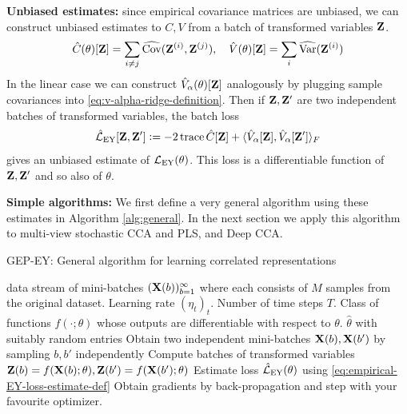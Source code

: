 \textbf{Unbiased estimates:}
since empirical covariance matrices are unbiased, we can construct unbiased estimates to $C, V$ from a batch of transformed variables $\mathbf{Z}$.
\begin{align}\label{eq:def-C-V-matrices-empirical}
    \hat{C}(\theta)[\mathbf{Z}] = \sum_{i \neq j} \widehat{\mathrm{Cov}}(\mathbf{Z}^{(i)}, \mathbf{Z}^{(j)}), \quad
    \hat{V}(\theta)[\mathbf{Z}] = \sum_{i} \widehat{\mathrm{Var}}(\mathbf{Z}^{(i)})
\end{align}
In the linear case we can construct $\hat{V}_\alpha(\theta)[\mathbf{Z}]$ analogously by plugging sample covariances into \cref{eq:v-alpha-ridge-definition}.
Then if $\mathbf{Z}, \mathbf{Z}'$ are two independent batches of transformed variables, the batch loss
\begin{align}\label{eq:empirical-EY-loss-estimate-def}
    \hat{\mathcal{L}}_\text{EY}[\mathbf{Z}, \mathbf{Z}'] \vcentcolon= - 2 \operatorname{trace} \hat{C}[\mathbf{Z}] + \langle \hat{V}_\alpha[\mathbf{Z}], \hat{V}_\alpha[\mathbf{Z}'] \rangle_F
\end{align}
gives an unbiased estimate of $\mathcal{L}_\text{EY}(\theta)$.%
This loss is a differentiable function of $\mathbf{Z}, \mathbf{Z}'$ and so also of $\theta$.

\textbf{Simple algorithms:}
We first define a very general algorithm using these estimates in Algorithm \ref{alg:general}.
In the next section we apply this algorithm to multi-view stochastic CCA and PLS, and Deep CCA.

\begin{algorithm}
   \caption{GEP-EY: General algorithm for learning correlated representations}
   \label{alg:general}
\begin{algorithmic}
    data stream of mini-batches $(\mathbf{X}(b))_{b=1}^\infty$ where each consists of $M$ samples from the original dataset. Learning rate $(\eta_t)_t$. Number of time steps $T$. Class of functions $f(\cdot; \theta)$ whose outputs are differentiable with respect to $\theta$.
    $\hat{\theta}$ with suitably random entries
       \STATE Obtain two independent mini-batches \( \mathbf{X}(b), \mathbf{X}(b') \) by sampling \( b, b' \) independently
       \STATE Compute batches of transformed variables $\mathbf{Z}(b) = f(\mathbf{X}(b); \theta), \mathbf{Z}(b') = f(\mathbf{X}(b'); \theta)$
       \STATE Estimate loss $\hat{\mathcal{L}}_\text{EY}(\theta)$ using \cref{eq:empirical-EY-loss-estimate-def}
       \STATE Obtain gradients by back-propagation and step with your favourite optimizer.
   \ENDFOR
\end{algorithmic}
\end{algorithm}

